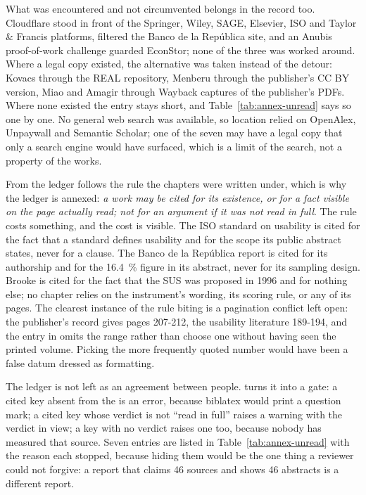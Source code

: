 What was encountered and not circumvented belongs in the record too. Cloudflare stood in front of
the Springer, Wiley, SAGE, Elsevier, ISO and Taylor \& Francis platforms,  filtered
the Banco de la República site, and an Anubis proof-of-work challenge guarded EconStor; none of
the three was worked around. Where a legal copy existed, the alternative was taken instead of the
detour: Kovacs through the REAL repository, Menberu through the publisher's CC BY version, Miao
and Amagir through Wayback captures of the publisher's PDFs. Where none existed the entry stays
short, and Table~\ref{tab:annex-unread} says so one by one. No general web search was available,
so location relied on OpenAlex, Unpaywall and Semantic Scholar; one of the seven may have a legal
copy that only a search engine would have surfaced, which is a limit of the search, not a property
of the works.

From the ledger follows the rule the chapters were written under, which is why the ledger is
annexed: \emph{a work may be cited for its existence, or for a fact visible on the page actually
read; not for an argument if it was not read in full}. The rule costs something, and the cost is
visible. The ISO standard on usability is cited for the fact that a standard defines usability and
for the scope its public abstract states, never for a clause. The Banco de la República report is
cited for its authorship and for the 16.4~\% figure in its abstract, never for its sampling design.
Brooke is cited for the fact that the SUS was proposed in 1996 and for nothing else; no chapter
relies on the instrument's wording, its scoring rule, or any of its pages. The clearest instance
of the rule biting is a pagination conflict left open: the publisher's record gives pages 207-212,
the usability literature 189-194, and the entry in  omits the range rather
than choose one without having seen the printed volume. Picking the more frequently quoted number
would have been a false datum dressed as formatting.

The ledger is not left as an agreement between people.  turns it into a
gate: a cited key absent from the  is an error, because biblatex would print a question
mark; a cited key whose verdict is not \enquote{read in full} raises a warning with the verdict in
view; a key with no verdict raises one too, because nobody has measured that source. Seven entries
are listed in Table~\ref{tab:annex-unread} with the reason each stopped, because hiding them would
be the one thing a reviewer could not forgive: a report that claims 46 sources and shows 46
abstracts is a different report.

